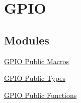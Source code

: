 \hypertarget{group___g_p_i_o}{\section{\-G\-P\-I\-O}
\label{group___g_p_i_o}
}
\subsection*{\-Modules}
\begin{DoxyCompactItemize}
\item 
\hyperlink{group___g_p_i_o___public___macros}{\-G\-P\-I\-O Public Macros}
\item 
\hyperlink{group___g_p_i_o___public___types}{\-G\-P\-I\-O Public Types}
\item 
\hyperlink{group___g_p_i_o___public___functions}{\-G\-P\-I\-O Public Functions}
\end{DoxyCompactItemize}
